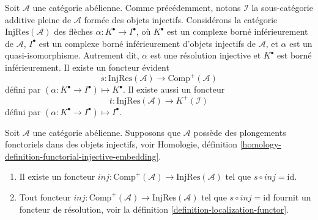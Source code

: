 \medskip\noindent
Soit $\mathcal{A}$ une catégorie abélienne. Comme précédemment, notons
$\mathcal{I}$ la sous-catégorie additive pleine de $\mathcal{A}$ formée des
objets injectifs. Considérons la catégorie
$\text{InjRes}(\mathcal{A})$ des flèches
$\alpha : K^\bullet \to I^\bullet$, où $K^\bullet$ est un complexe borné
inférieurement de $\mathcal{A}$, $I^\bullet$ est un complexe borné
inférieurement d'objets injectifs de $\mathcal{A}$, et $\alpha$ est un
quasi-isomorphisme. Autrement dit, $\alpha$ est une résolution injective et
$K^\bullet$ est borné inférieurement. Il existe un foncteur évident
$$
s : \text{InjRes}(\mathcal{A}) \longrightarrow \text{Comp}^{+}(\mathcal{A})
$$
défini par $(\alpha : K^\bullet \to I^\bullet) \mapsto K^\bullet$.
Il existe aussi un foncteur
$$
t : \text{InjRes}(\mathcal{A}) \longrightarrow K^{+}(\mathcal{I})
$$
défini par $(\alpha : K^\bullet \to I^\bullet) \mapsto I^\bullet$.

\begin{lemma}
\label{lemma-functorial-injective-resolutions}
Soit $\mathcal{A}$ une catégorie abélienne.
Supposons que $\mathcal{A}$ possède des plongements fonctoriels dans des
objets injectifs, voir Homologie, définition
\ref{homology-definition-functorial-injective-embedding}.
\begin{enumerate}
\item Il existe un foncteur
$inj : \text{Comp}^{+}(\mathcal{A}) \to \text{InjRes}(\mathcal{A})$ tel que
$s \circ inj = \text{id}$.
\item Tout foncteur
$inj : \text{Comp}^{+}(\mathcal{A}) \to \text{InjRes}(\mathcal{A})$ tel que
$s \circ inj = \text{id}$ fournit un foncteur de résolution, voir la
définition \ref{definition-localization-functor}.
\end{enumerate}
\end{lemma}

